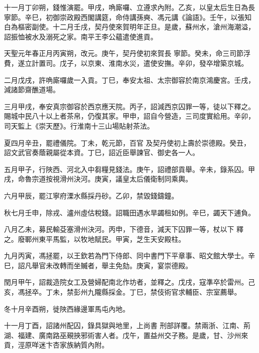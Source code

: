 \begin{pinyinscope}
 十一月丁卯朔，錢惟演罷。甲戌，唃廝囉、立遵求內附。乙亥，以皇太后生日為長寧節。辛巳，初御崇政殿西閣講筵，命侍講孫奭、馮元講《論語》。壬午，以張知白為樞密副使。十二月壬戌，契丹使來賀明年正旦。是歲，蘇州水，滄州海潮溢，詔振恤被水及溺死之家。南平王李公蘊遣使進貢。



 天聖元年春正月丙寅朔，改元。庚午，契丹使初來賀長
 寧節。癸未，命三司節浮費，遂立計置司。戊子，以京東、淮南水災，遣使安撫。辛卯，發卒增築京城。



 二月戊戌，許唃廝囉歲一入貢。丁巳，奉安太祖、太宗御容於南京鴻慶宮。壬戌，減諸節齋醮道場。



 三月甲戌，奉安真宗御容於西京應天院。丙子，詔減西京囚罪一等，徒以下釋之。賜城中民八十以上者茶帛，仍復其家。甲申，詔自今營造，三司度實給用。辛卯，司天監上《崇天歷》。行淮南十三山場貼射茶法。



 夏四月辛丑，罷禮儀院。丁未，乾元節，百官
 及契丹使初上壽於崇德殿。癸丑，詔文武官奏蔭親屬從本資。丁巳，詔近臣舉諫官、御史各一人。



 五月甲子，行陜西、河北入中芻糧見錢法。庚午，詔禮部貢舉。辛未，錄系囚。甲戌，命魯宗道按視滑州決河。庚寅，議皇太后儀衛制同乘輿。



 六月甲辰，罷江寧府溧水縣採丹砂。乙卯，禁毀錢鑄鐘。



 秋七月壬申，除戎、瀘州虛估稅錢。詔職田遇水旱蠲租如例。辛巳，蠲天下逋負。



 八月乙未，募民輸芟塞滑州決河。丙申，下德音，減天下囚罪一等，杖以下
 釋之。廢鄆州東平馬監，以牧地賦民。甲寅，芝生天安殿柱。



 九月丙寅，馮拯罷，以王欽若為門下侍郎、同中書門下平章事、昭文館大學士。辛巳，詔凡舉官未改轉而坐贓者，舉主免劾。庚寅，宴崇德殿。



 閏月甲午，詔裁造院女工及營婦配南北作坊者，並釋之。戊戌，寇準卒於雷州。己亥，馮拯卒。丁未，禁彭州九隴縣採金。丁巳，禁伎術官求輔臣、宗室薦舉。



 冬十月辛酉朔，徙陜西緣邊軍馬屯內地。



 十一月丁酉，詔諸州配囚，錄具獄與地里，上尚書
 刑部詳覆。禁兩浙、江南、荊湖、福建、廣南路巫覡挾邪術害人者。戊午，置益州交子務。是歲，甘、沙州來貢，涇原咩迷卞杏家族納質內附。




\end{pinyinscope}
